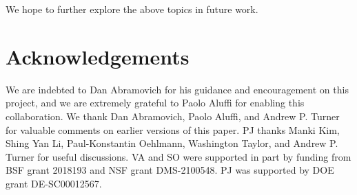 \documentclass[11pt,oneside,english]{article}
\numberwithin{equation}{section}
\theoremstyle{definition}
\begin{document}
We hope to further explore the above topics in future work.

\label{sec:discussion}

\section*{Acknowledgements}
We are indebted to Dan Abramovich for his guidance and encouragement on this project, and we are extremely grateful to Paolo Aluffi for enabling this collaboration. We thank Dan Abramovich, Paolo Aluffi, and Andrew P. Turner for valuable comments on earlier versions of this paper. PJ thanks Manki Kim, Shing Yan Li, Paul-Konstantin Oehlmann, Washington Taylor, and Andrew P. Turner for useful discussions. VA and SO were supported in part by funding from BSF grant 2018193 and NSF grant DMS-2100548. PJ was supported by DOE grant DE-SC00012567. 

\appendix
\end{document}
